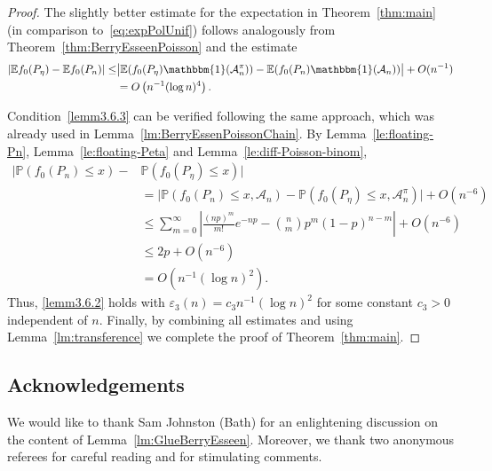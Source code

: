 \documentclass[10pt]{amsart}
\theoremstyle{definition}\newtheorem{defi}[theo]{Definition}\newtheorem{rema}[theo]{Remark}\newtheorem{exam}[theo]{Example}\newtheorem{exem}[theo]{Example}\newtheorem{nota}[theo]{Notation}
\newcommand{\ind}{\mathbbm{1}}
\newcommand{\bbE}{\mathbb{E}}
\newcommand{\bbP}{\mathbb{P}}
\newcommand{\clA}{\mathcal{A}}
\begin{document}
\begin{proof}
The slightly better estimate for the expectation in Theorem~\ref{thm:main} (in comparison to~\eqref{eq:expPolUnif}) follows analogously from Theorem~\ref{thm:BerryEsseenPoisson} and the estimate
\begin{align*}
| \bbE f_0(P_\eta) - \bbE f_0(P_n) |
\leq & \big| \bbE (f_0(P_\eta) \ind(\clA^\pi_n)) - \bbE (f_0(P_n) \ind(\clA_n)) \big| + O(n^{-1})
\\ & = O\left(n^{-1}(\log n)^4\right).
\end{align*}


Condition~\eqref{lemm3.6.3} can be verified following the same approach, which was already used in Lemma~\ref{lm:BerryEssenPoissonChain}. By Lemma~\ref{le:floating-Pn}, Lemma~\ref{le:floating-Peta} and Lemma~\ref{le:diff-Poisson-binom},
\begin{align*}
\big|\bbP(f_0(P_n)\leq x)- & \bbP(f_0(P_{\eta})\leq x)\big|
\\ &= \big|\bbP\left(f_0(P_n)\leq x, \clA_n\right)-\bbP\left(f_0(P_{\eta})\leq x, \clA_n^\pi\right)\big| + O(n^{-6})
\\ & \leq
\sum_{m=0}^\infty \left| \frac{(np)^m}{m!} e^{- np} - \binom{n}{m} p^m (1-p)^{n-m} \right| + O(n^{-6})
\\ & \leq 2p + O(n^{-6})\\
& = O\left(n^{-1} (\log n)^2\right).
\end{align*}
Thus, \eqref{lemm3.6.2} holds with $\varepsilon_3(n)=c_3 n^{-1} (\log n)^2$ for some constant $c_3>0$ independent of $n$. Finally, by combining all estimates and using Lemma~\ref{lm:transference} we complete the proof of Theorem~\ref{thm:main}.
\end{proof}


\subsection*{Acknowledgements}
We would like to thank Sam Johnston (Bath) for an enlightening discussion on the content of Lemma~\ref{lm:GlueBerryEsseen}. Moreover, we thank two anonymous referees for careful reading and for stimulating comments.
\end{document}
